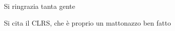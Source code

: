 Si ringrazia tanta gente


Si cita il CLRS, che è proprio un mattonazzo \cite{Cormen:2009:IAT:1614191} ben fatto

